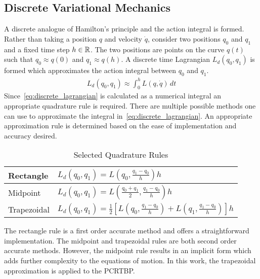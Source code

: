 \documentclass[letterpaper, preprint, paper,11pt]{AAS}	%
\begin{document}
\subsection{Discrete Variational Mechanics}
A discrete analogue of Hamilton's principle and the action integral is formed.
Rather than taking a position \( q \) and velocity \( \dot{q} \), consider two positions \( q_0 \) and \( q_1 \) and a fixed time step \( h \in \mathbb{R} \).
The two positions are points on the curve \( q(t) \) such that \( q_0 \approx q(0) \) and \( q_1 \approx q(h) \).
A discrete time Lagrangian \( L_d( q_0, q_1) \) is formed which approximates the action integral between \( q_0 \) and \( q_1 \). 
\begin{align}\label{eq:discrete_lagrangian}
	L_d\left( q_0 , q_1 \right) \approx \int_{0}^{h} L \left( q , \dot{q} \right) \, dt
\end{align}
Since~\cref{eq:discrete_lagrangian} is calculated as a numerical integral an appropriate quadrature rule is required.
There are multiple possible methods one can use to approximate the integral in~\cref{eq:discrete_lagrangian}.
An appropriate approximation rule is determined based on the ease of implementation and accuracy desired.
\begin{table}[htbp]
\caption{Selected Quadrature Rules\label{tab:quadrature}}
\begin{center}
\begin{tabular}{l|l}Rectangle & \( L_d(q_0,q_1) =L(q_0,\frac{q_1-q_0}{h}) h \)  \\ \hline
Midpoint & \( L_d(q_0,q_1) = L(\frac{q_0 + q_1}{2},\frac{q_1 - q_0}{h}) h \) \\ \hline
Trapezoidal & \( L_d(q_0, q_1) = \frac{1}{2} \left[ L(q_0, \frac{q_1 - q_0}{h} ) + L(q_1, \frac{q_1 - q_0 }{h} )\right] h \)
\end{tabular} 
\end{center}
\end{table}
The rectangle rule is a first order accurate method and offers a straightforward implementation.
The midpoint and trapezoidal rules are both second order accurate methods. 
However, the midpoint rule results in an implicit form which adds further complexity to the equations of motion.
In this work, the trapezoidal approximation is applied to the PCRTBP.
\end{document}
